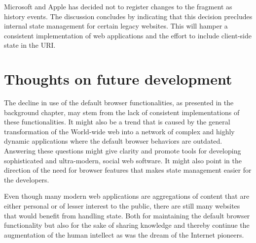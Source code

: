 \documentclass[english]{ifimaster}
\begin{document}
Microsoft and Apple has decided not to register changes to the fragment as history events. The discussion concludes by indicating that this decision precludes internal state management for certain legacy websites. This will hamper a consistent implementation of web applications and the effort to include client-side state in the URI. 

\section{Thoughts on future development}
The decline in use of the default browser functionalities, as presented in the background chapter, may stem from the lack of consistent implementations of these functionalities. It might also be a trend that is caused by the general transformation of the World-wide web into a network of complex and highly dynamic applications where the default browser behaviors are outdated. Answering these questions might give clarity and promote tools for developing sophisticated and ultra-modern, social web software. It might also point in the direction of the need for browser features that makes state management easier for the developers. 

Even though many modern web applications are aggregations of content that are either personal or of lesser interest to the public, there are still many websites that would benefit from handling state. Both for maintaining the default browser functionality but also for the sake of sharing knowledge and thereby continue the augmentation of the human intellect as was the dream of the Internet pioneers.
\newpage
\backmatter
\renewcommand{\refname}{Bibliography}


\addcontentsline{toc}{section}{\refname}
\printbibliography
\newpage\null\thispagestyle{empty}\newpage
\end{document}
